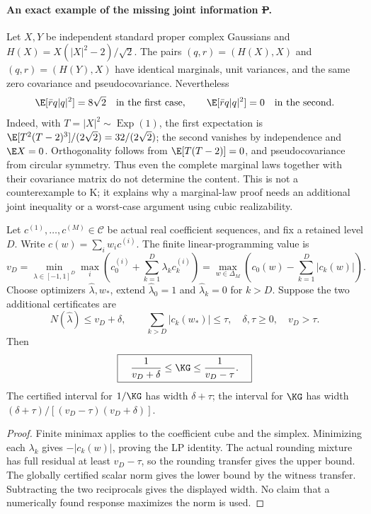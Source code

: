 \paragraph{An exact example of the missing joint information \st{P}.}
Let $X,Y$ be independent standard proper complex Gaussians and
$H(X)=X(|X|^2-2)/\sqrt2$. The pairs $(q,r)=(H(X),X)$ and
$(q,r)=(H(Y),X)$ have identical marginals, unit variances, and the
same zero covariance and pseudocovariance. Nevertheless
\[
 \E[\bar r q|q|^2]=8\sqrt2\quad\hbox{in the first case},
 \qquad \E[\bar r q|q|^2]=0\quad\hbox{in the second}.
\]
Indeed, with $T=|X|^2\sim\operatorname{Exp}(1)$, the first expectation
is $\E[T^2(T-2)^3]/(2\sqrt2)=32/(2\sqrt2)$; the second vanishes
by independence and $\E X=0$. Orthogonality follows from
$\E[T(T-2)]=0$, and pseudocovariance from circular symmetry.
Thus even the complete marginal laws together with their covariance
matrix do not determine the content. This is not a counterexample
to K; it explains why a marginal-law proof needs an additional joint
inequality or a worst-case argument using cubic realizability.

\begin{proposition}
\label{prop:pool-two-errors-20261022}
Let $c^{(1)},\ldots,c^{(M)}\in\mathcal C$ be actual real coefficient
sequences, and fix a retained level $D$. Write $c(w)=\sum_iw_ic^{(i)}$.
The finite linear-programming value is
\[
 v_D=\min_{\lambda\in[-1,1]^D}\max_i
       \left(c^{(i)}_0+\sum_{k=1}^D\lambda_k c^{(i)}_k\right)
     =\max_{w\in\Delta_M}
       \left(c_0(w)-\sum_{k=1}^D|c_k(w)|\right).
\]
Choose optimizers $\widehat\lambda,w_*$, extend
$\widehat\lambda_0=1$ and $\widehat\lambda_k=0$ for $k>D$.
Suppose the two additional certificates are
\[
 N(\widehat\lambda)\le v_D+\delta,\qquad
 \sum_{k>D}|c_k(w_*)|\le\tau,
 \quad \delta,\tau\ge0,\quad v_D>\tau.
\]
Then
\begin{equation}\label{eq:pool-two-errors-20261022}
 \boxed{\quad \frac1{v_D+\delta}\le\KG\le\frac1{v_D-\tau}.\quad}
\end{equation}
The certified interval for $1/\KG$ has width $\delta+\tau$;
the interval for $\KG$ has width
$(\delta+\tau)/[(v_D-\tau)(v_D+\delta)]$.
\end{proposition}
\begin{proof}
Finite minimax applies to the coefficient cube and the simplex.
Minimizing each $\lambda_k$ gives $-|c_k(w)|$, proving the LP identity.
The actual rounding mixture has full residual at least $v_D-\tau$,
so the rounding transfer gives the upper bound. The globally certified
scalar norm gives the lower bound by the witness transfer. Subtracting
the two reciprocals gives the displayed width. No claim that a
numerically found response maximizes the norm is used.
\end{proof}


